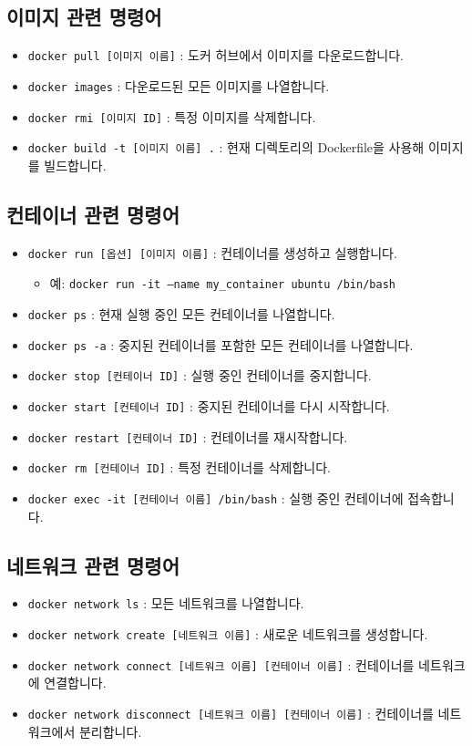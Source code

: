 \documentclass{article}
\begin{document}
\subsection*{이미지 관련 명령어}
\begin{itemize}
    \item \texttt{docker pull [이미지 이름]} : 도커 허브에서 이미지를 다운로드합니다.
    \item \texttt{docker images} : 다운로드된 모든 이미지를 나열합니다.
    \item \texttt{docker rmi [이미지 ID]} : 특정 이미지를 삭제합니다.
    \item \texttt{docker build -t [이미지 이름] .} : 현재 디렉토리의 Dockerfile을 사용해 이미지를 빌드합니다.
\end{itemize}

\subsection*{컨테이너 관련 명령어}
\begin{itemize}
    \item \texttt{docker run [옵션] [이미지 이름]} : 컨테이너를 생성하고 실행합니다.
    \begin{itemize}
        \item 예: \texttt{docker run -it --name my\_container ubuntu /bin/bash}
    \end{itemize}
    \item \texttt{docker ps} : 현재 실행 중인 모든 컨테이너를 나열합니다.
    \item \texttt{docker ps -a} : 중지된 컨테이너를 포함한 모든 컨테이너를 나열합니다.
    \item \texttt{docker stop [컨테이너 ID]} : 실행 중인 컨테이너를 중지합니다.
    \item \texttt{docker start [컨테이너 ID]} : 중지된 컨테이너를 다시 시작합니다.
    \item \texttt{docker restart [컨테이너 ID]} : 컨테이너를 재시작합니다.
    \item \texttt{docker rm [컨테이너 ID]} : 특정 컨테이너를 삭제합니다.
    \item \texttt{docker exec -it [컨테이너 이름] /bin/bash} : 실행 중인 컨테이너에 접속합니다.
\end{itemize}

\subsection*{네트워크 관련 명령어}
\begin{itemize}
    \item \texttt{docker network ls} : 모든 네트워크를 나열합니다.
    \item \texttt{docker network create [네트워크 이름]} : 새로운 네트워크를 생성합니다.
    \item \texttt{docker network connect [네트워크 이름] [컨테이너 이름]} : 컨테이너를 네트워크에 연결합니다.
    \item \texttt{docker network disconnect [네트워크 이름] [컨테이너 이름]} : 컨테이너를 네트워크에서 분리합니다.
\end{itemize}
\end{document}
